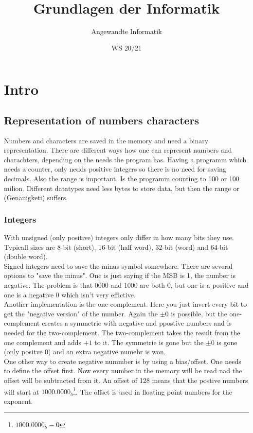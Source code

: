 \documentclass[a4paper]{scrartcl}
\author{Angewandte Informatik}
\title{Grundlagen der Informatik}
\date{WS 20/21}
\begin{document}
    \maketitle
    \newpage
    \tableofcontents
    \newpage
    \section{Intro}
        \subsection{Representation of numbers characters}
        Numbers and characters are saved in the memory and need a binary representation. There are different ways how one can represent numbers and charachters,
        depending on the needs the program has. Having a programm which needs a counter, only nedds positive integers so there is no need for saving decimals.  Also the 
        range is important. Is the programm counting to 100 or 100 milion. Different datatypes need less bytes to store data, but then the range or (Genauigketi) suffers.
        
        \subsubsection*{Integers}
        With unsigned (only positive) integers only differ in how many bits they use. Typicall sizes are  8-bit (short), 16-bit (half word), 32-bit (word) and 64-bit (double word). \\
        Signed integers need to save the minus symbol somewhere. There are several options to "save the minus". One is just saying if the MSB is 1, the number is negative. The problem
        is that \(0000\) and \(1000\) are both \(0\), but one is a positive and one is a negative \(0\) which isn't very effictive. \\
        Another implementation is the one-complement.
        Here you just invert every bit to get the "negative version" of the number. Again the \(\pm 0\) is possible, but the one-complement 
        creates a symmetrie with negative and ppostive numbers and is needed for the two-complement. 
        The two-complement takes the result from the one complement and adds \(+1\) to it. The symmetrie is gone but the \(\pm 0\) is gone (only positve 0) and an extra negative numebr is won. \\
        One other way to create negative nummber is by using a bias/offset. One needs to define the offset first. Now every number in the memory will be read nad the offset will be 
        subtracted from it. An offset of 128 means that the postive numbers will start at \(1000.0000_b \)\footnote{\(1000.0000_b \equiv 0\)}. The offset is used in floating point numbers for the exponent.
\end{document}
